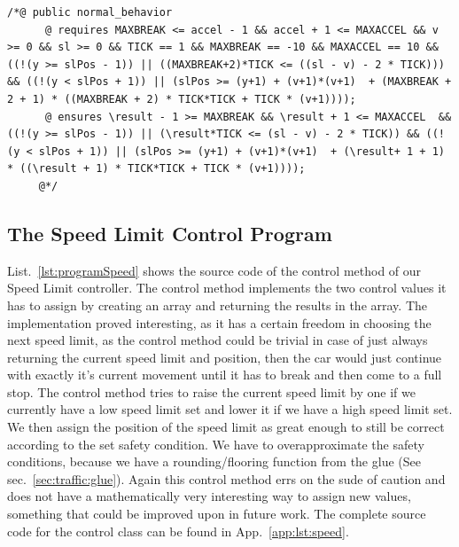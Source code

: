 \begin{lstlisting}[label=lst:CondCar]
/*@ public normal_behavior
	  @ requires MAXBREAK <= accel - 1 && accel + 1 <= MAXACCEL && v >= 0 && sl >= 0 && TICK == 1 && MAXBREAK == -10 && MAXACCEL == 10 && ((!(y >= slPos - 1)) || ((MAXBREAK+2)*TICK <= ((sl - v) - 2 * TICK))) && ((!(y < slPos + 1)) || (slPos >= (y+1) + (v+1)*(v+1)  + (MAXBREAK + 2 + 1) * ((MAXBREAK + 2) * TICK*TICK + TICK * (v+1))));
	  @ ensures \result - 1 >= MAXBREAK && \result + 1 <= MAXACCEL  && ((!(y >= slPos - 1)) || (\result*TICK <= (sl - v) - 2 * TICK)) && ((!(y < slPos + 1)) || (slPos >= (y+1) + (v+1)*(v+1)  + (\result+ 1 + 1) * ((\result + 1) * TICK*TICK + TICK * (v+1))));
	 @*/
\end{lstlisting}

\subsection{The Speed Limit Control Program}
\label{subsec:traffic:speed}

List.~\ref{lst:programSpeed} shows the source code of the control method of our Speed Limit controller. The control method implements the two control values it has to assign by creating an array and returning the results in the array. The implementation proved interesting, as it has a certain freedom in choosing the next speed limit, as the control method could be trivial in case of just always returning the current speed limit and position, then the car would just continue with exactly it's current movement until it has to break and then come to a full stop. The control method tries to raise the current speed limit by one if we currently have a low speed limit set and lower it if we have a high speed limit set. We then assign the position of the speed limit as great enough to still be correct according to the set safety condition. We have to overapproximate the safety conditions, because we have a rounding/flooring function from the glue (See sec.~\ref{sec:traffic:glue}). Again this control method errs on the sude of caution and does not have a mathematically very interesting way to assign new values, something that could be improved upon in future work. The complete source code for the control class can be found in App.~\ref{app:lst:speed}.

